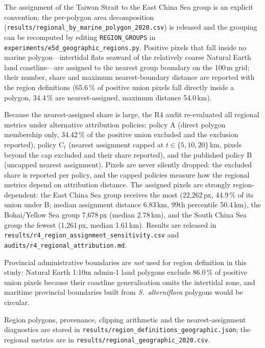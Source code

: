 \documentclass[11pt]{article}
\begin{document}
The assignment of the Taiwan Strait to the East China Sea group is an explicit
convention; the per-polygon area decomposition
(\texttt{results/regional\_by\_marine\_polygon\_2020.csv}) is released and the
grouping can be recomputed by editing \texttt{REGION\_GROUPS} in
\texttt{experiments/e5d\_geographic\_regions.py}. Positive pixels that fall inside no marine polygon---intertidal
flats seaward of the relatively coarse Natural Earth land coastline---are
assigned to the nearest group boundary on the 100\,m grid; their number, share
and maximum nearest-boundary distance are reported with the region
definitions (65.6\,\% of positive union pixels fall directly inside a polygon,
34.4\,\% are nearest-assigned, maximum distance 54.0\,km).

Because the nearest-assigned share is large, the R4 audit re-evaluated all
regional metrics under alternative attribution policies: policy A (direct
polygon membership only, 34.42\,\% of the positive union excluded and the
exclusion reported), policy C$_t$ (nearest assignment capped at
$t \in \{5, 10, 20\}$\,km, pixels beyond the cap excluded and their share
reported), and the published policy B (uncapped nearest assignment). Pixels
are never silently dropped: the excluded share is reported per policy, and
the capped policies measure how the regional metrics depend on attribution
distance. The assigned pixels are strongly region-dependent: the East China
Sea group receives the most (22,262\,px, 44.9\,\% of its union under B;
median assignment distance 6.83\,km, 99th percentile 50.4\,km), the
Bohai/Yellow Sea group 7,678\,px (median 2.78\,km), and the South China Sea
group the fewest (1,261\,px, median 1.61\,km). Results are released in
\texttt{results/r4\_region\_assignment\_sensitivity.csv} and
\texttt{audits/r4\_regional\_attribution.md}.

Provincial administrative boundaries are \emph{not} used for region definition
in this study: Natural Earth 1:10m admin-1 land polygons exclude 86.0\,\% of
positive union pixels because their coastline generalisation omits the
intertidal zone, and maritime provincial boundaries built from
\textit{S.~alterniflora} polygons would be circular\citep{olofsson_2014_area_bias}.

Region polygons, provenance, clipping arithmetic and the nearest-assignment
diagnostics are stored in \texttt{results/region\_definitions\_geographic.json};
the regional metrics are in \texttt{results/regional\_geographic\_2020.csv}.

\end{document}
